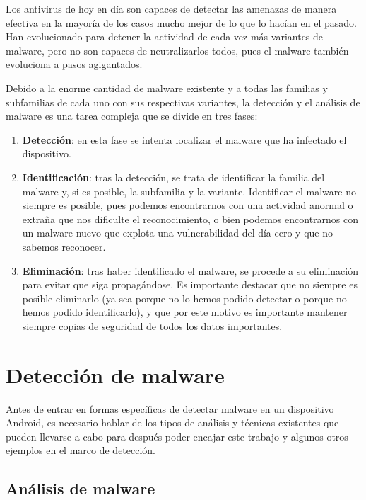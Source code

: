 Los antivirus de hoy en día son capaces de detectar las amenazas de manera efectiva en la mayoría de los casos\hypersetup{citecolor=red}\cite{antimalware} mucho mejor de lo que lo hacían en el pasado. Han evolucionado para detener la actividad de cada vez más variantes de malware, pero no son capaces de neutralizarlos todos, pues el malware también evoluciona a pasos agigantados.

Debido a la enorme cantidad de malware existente y a todas las familias y subfamilias de cada uno con sus respectivas variantes, la detección y el análisis de malware es una tarea compleja que se divide en tres fases\hypersetup{citecolor=red}\cite{malwaredetection}:

\begin{enumerate}
	\item \textbf{Detección}: en esta fase se intenta localizar el malware que ha infectado el dispositivo.
	\item \textbf{Identificación}: tras la detección, se trata de identificar la familia del malware y, si es posible, la subfamilia y la variante. Identificar el malware no siempre es posible, pues podemos encontrarnos con una actividad anormal o extraña que nos dificulte el reconocimiento, o bien podemos encontrarnos con un malware nuevo que explota una vulnerabilidad del día cero y que no sabemos reconocer.
	\item \textbf{Eliminación}: tras haber identificado el malware, se procede a su eliminación para evitar que siga propagándose. Es importante destacar que no siempre es posible eliminarlo (ya sea porque no lo hemos podido detectar o porque no hemos podido identificarlo), y que por este motivo es importante mantener siempre copias de seguridad de todos los datos importantes.
\end{enumerate}

\section{Detección de malware}

Antes de entrar en formas específicas de detectar malware en un dispositivo Android, es necesario hablar de los tipos de análisis y técnicas existentes que pueden llevarse a cabo para después poder encajar este trabajo y algunos otros ejemplos en el marco de detección.

\subsection{Análisis de malware}

